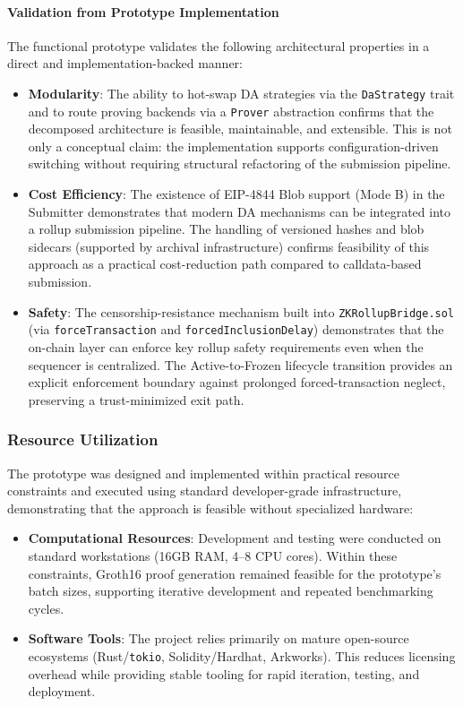 \paragraph{Validation from Prototype Implementation}
The functional prototype validates the following architectural properties in a direct and implementation-backed manner:

\begin{itemize}
    \item \textbf{Modularity}: The ability to hot-swap DA strategies via the \texttt{DaStrategy} trait and to route proving backends via a \texttt{Prover} abstraction confirms that the decomposed architecture is feasible, maintainable, and extensible. This is not only a conceptual claim: the implementation supports configuration-driven switching without requiring structural refactoring of the submission pipeline.
    
    \item \textbf{Cost Efficiency}: The existence of EIP-4844 Blob support (Mode B) in the Submitter demonstrates that modern DA mechanisms can be integrated into a rollup submission pipeline. The handling of versioned hashes and blob sidecars (supported by archival infrastructure) confirms feasibility of this approach as a practical cost-reduction path compared to calldata-based submission.
    
    \item \textbf{Safety}: The censorship-resistance mechanism built into \texttt{ZKRollupBridge.sol} (via \texttt{forceTransaction} and \texttt{forcedInclusionDelay}) demonstrates that the on-chain layer can enforce key rollup safety requirements even when the sequencer is centralized. The Active-to-Frozen lifecycle transition provides an explicit enforcement boundary against prolonged forced-transaction neglect, preserving a trust-minimized exit path.
\end{itemize}

\subsubsection{Resource Utilization}
\vspace{12pt}

The prototype was designed and implemented within practical resource constraints and executed using standard developer-grade infrastructure, demonstrating that the approach is feasible without specialized hardware:

\begin{itemize}
    \item \textbf{Computational Resources}: Development and testing were conducted on standard workstations (16GB RAM, 4--8 CPU cores). Within these constraints, Groth16 proof generation remained feasible for the prototype’s batch sizes, supporting iterative development and repeated benchmarking cycles.
    
    \item \textbf{Software Tools}: The project relies primarily on mature open-source ecosystems (Rust/\texttt{tokio}, Solidity/Hardhat, Arkworks). This reduces licensing overhead while providing stable tooling for rapid iteration, testing, and deployment.
\end{itemize}

